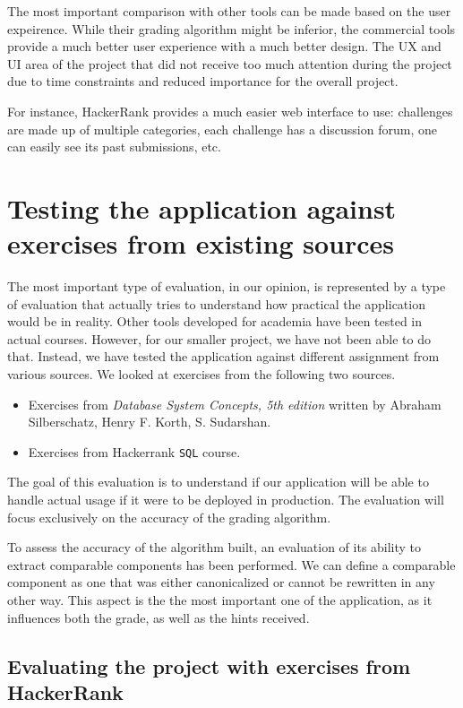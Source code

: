 The most important comparison with other tools can be made based on the user expeirence. While their grading algorithm might be inferior, the commercial tools provide a much better user experience with a much better design. The UX and UI area of the project that did not receive too much attention during the project due to time constraints and reduced importance for the overall project.

For instance, HackerRank provides a much easier web interface to use: challenges are made up of multiple categories, each challenge has a discussion forum, one can easily see its past submissions, etc.


\section{Testing the application against exercises from existing sources}

The most important type of evaluation, in our opinion, is represented by a type of evaluation that actually tries to understand how practical the application would be in reality. Other tools developed for academia have been tested in actual courses. However, for our smaller project, we have not been able to do that. Instead, we have tested the application against different assignment from various sources. We looked at exercises from the following two sources.

\begin{itemize}
    \item Exercises from \textit{Database System Concepts, 5th edition} written by Abraham Silberschatz, Henry F. Korth, S. Sudarshan.
    \item Exercises from Hackerrank \texttt{SQL} course.
\end{itemize}

The goal of this evaluation is to understand if our application will be able to handle actual usage if it were to be deployed in production. The evaluation will focus exclusively on the accuracy of the grading algorithm.


To assess the accuracy of the algorithm built, an evaluation of its ability to extract comparable components has been performed. We can define  a comparable component as one that was either canonicalized or cannot be rewritten in any other way. This aspect is the the most important one of the application, as it influences both the grade, as well as the hints received.

\subsection{Evaluating the project with exercises from HackerRank}

